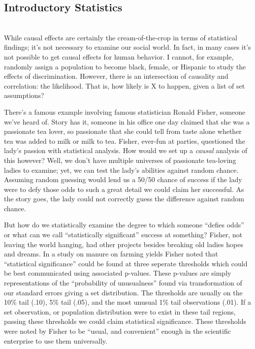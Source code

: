 \documentclass[12pt]{article}\usepackage[]{graphicx}\usepackage[]{color}
\begin{document}
\begin{flushleft}
\clearpage
\section{Introductory Statistics}
\hfill \\

While causal effects are certainly the cream-of-the-crop in terms of statistical findings; it's not necessary to examine our social world. In fact, in many cases it's not possible to get causal effects for human behavior. I cannot, for example, randomly assign a population to become black, female, or Hispanic to study the effects of discrimination. However, there is an intersection of causality and correlation: the likelihood. That is, how likely is X to happen, given a list of set assumptions?

There's a famous example involving famous statistician Ronald Fisher, someone we've heard of. Story has it, someone in his office one day claimed that she was a passionate tea lover, so passionate that she could tell from taste alone whether tea was added to milk or milk to tea. Fisher, ever-fun at parties, questioned the lady's passion with statistical analysis. How would we set up a \textit{causal} analysis of this however? Well, we don't have multiple universes of passionate tea-loving ladies to examine; yet, we can test the lady's abilities against random chance. Assuming random guessing would lend us a 50/50 chance of success if the lady were to defy those odds to such a great detail we could claim her successful. As the story goes, the lady could not correctly guess the difference against random chance.

But how do we statistically examine the degree to which someone ``defies odds'' or what can we call ``statistically significant'' success at something? Fisher, not leaving the world hanging, had other projects besides breaking old ladies hopes and dreams. In a study on manure on farming yields Fisher noted that ``statistical significance'' could be found at three seperate thresholds which could be best communicated using associated p-values. These p-values are simply representations of the ``probability of unusualness'' found via transformation of our standard errors giving a set distribution. The thresholds are usually on the 10\% tail (.10), 5\% tail (.05), and the most unusual 1\% tail observations (.01). If a set observation, or population distribution were to exist in these tail regions, passing these thresholds we could claim statistical significance. These thresholds were noted by Fisher to be ``usual, and convenient'' enough in the scientific enterprise to use them universally.


\end{flushleft}
\end{document}
